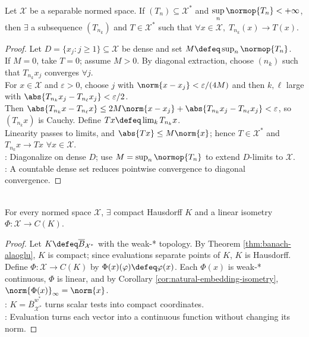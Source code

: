 \begin{theorem} \label{thm:helly-selection-bounded-dual-sequences} \\
Let $\mathcal{X}$ be a separable normed space. If $(T_n)\subseteq\mathcal{X}^*$ and $\sup\limits_n\normop{T_n}<+\infty$, then $\exists$ a subsequence $(T_{n_k})$ and $T\in\mathcal{X}^*$ such that
$\forall x\in\mathcal{X},\; T_{n_k}(x)\to T(x).$
\begin{proof}
Let $D=\{x_j:j\geq1\}\subseteq\mathcal X$ be dense and set $M\defeq\sup_n\normop{T_n}$.\\
If $M=0$, take $T=0$; assume $M>0$. By diagonal extraction, choose $(n_k)$ such that $T_{n_k}x_j$ converges $\forall j$.\\
For $x\in\mathcal X$ and $\varepsilon>0$, choose $j$ with $\norm{x-x_j}<\varepsilon/(4M)$ and then $k,\ell$ large with $\abs{T_{n_k}x_j-T_{n_\ell}x_j}<\varepsilon/2$.\\
Then $\abs{T_{n_k}x-T_{n_\ell}x}\leq2M\norm{x-x_j}+\abs{T_{n_k}x_j-T_{n_\ell}x_j}<\varepsilon$, so $(T_{n_k}x)$ is Cauchy. Define $Tx\defeq\lim_kT_{n_k}x$.\\
Linearity passes to limits, and $\abs{Tx}\leq M\norm{x}$; hence $T\in\mathcal X^*$ and $T_{n_k}x\to Tx$ $\forall x\in\mathcal X$.\\
: Diagonalize on dense $D$; use $M=\sup_n\normop{T_n}$ to extend $D$-limits to $\mathcal X$.\\
: A countable dense set reduces pointwise convergence to diagonal convergence.
\end{proof}
\end{theorem}

\begin{corollary} \label{cor:banach-space-embeds-into-c-of-compact} \\
For every normed space $\mathcal{X}$, $\exists$ compact Hausdorff $K$ and a linear isometry $\Phi:\mathcal{X}\to C(K)$.
\begin{proof}
Let $K\defeq\overline{B}_{\mathcal{X}^*}$ with the weak-* topology. By Theorem \ref{thm:banach-alaoglu}, $K$ is compact; since evaluations separate points of $K$, $K$ is Hausdorff. Define $\Phi:\mathcal{X}\to C(K)$ by $\Phi(x)(\varphi)\defeq\varphi(x)$. Each $\Phi(x)$ is weak-* continuous, $\Phi$ is linear, and by Corollary \ref{cor:natural-embedding-isometry}, $\norm{\Phi(x)}_\infty=\norm{x}$.\\
: $K=\overline{B}_{\mathcal X^*}^{w^*}$ turns scalar tests into compact coordinates.\\
: Evaluation turns each vector into a continuous function without changing its norm.
\end{proof}
\end{corollary}

